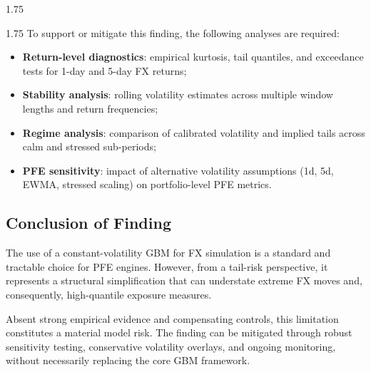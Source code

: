 \begin{spacing}{1.75}
\begin{spacing}{1.75}
		To support or mitigate this finding, the following analyses are required:
		\begin{itemize}
			\item \textbf{Return-level diagnostics}: empirical kurtosis, tail quantiles, and exceedance tests for 1-day and 5-day FX returns;
			\item \textbf{Stability analysis}: rolling volatility estimates across multiple window lengths and return frequencies;
			\item \textbf{Regime analysis}: comparison of calibrated volatility and implied tails across calm and stressed sub-periods;
			\item \textbf{PFE sensitivity}: impact of alternative volatility assumptions (1d, 5d, EWMA, stressed scaling) on portfolio-level PFE metrics.
		\end{itemize}
		
		\subsection{Conclusion of Finding}
		The use of a constant-volatility GBM for FX simulation is a standard and tractable choice for PFE engines. However, from a tail-risk perspective, it represents a structural simplification that can understate extreme FX moves and, consequently, high-quantile exposure measures.
		
		Absent strong empirical evidence and compensating controls, this limitation constitutes a material model risk. The finding can be mitigated through robust sensitivity testing, conservative volatility overlays, and ongoing monitoring, without necessarily replacing the core GBM framework.
		
	\end{spacing}
	\clearpage
	
	
\end{spacing}
\clearpage
